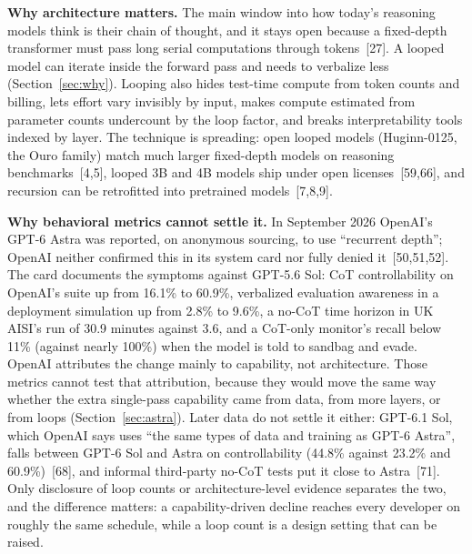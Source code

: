 \documentclass[11pt,letterpaper]{article}
\begin{document}
\textbf{Why architecture matters.} The main window into how today's reasoning models think is their chain of thought, and it stays open because a fixed-depth transformer must pass long serial computations through tokens~[27]. A looped model can iterate inside the forward pass and needs to verbalize less (Section~\ref{sec:why}). Looping also hides test-time compute from token counts and billing, lets effort vary invisibly by input, makes compute estimated from parameter counts undercount by the loop factor, and breaks interpretability tools indexed by layer. The technique is spreading: open looped models (Huginn-0125, the Ouro family) match much larger fixed-depth models on reasoning benchmarks~[4,5], looped 3B and 4B models ship under open licenses~[59,66], and recursion can be retrofitted into pretrained models~[7,8,9].

\textbf{Why behavioral metrics cannot settle it.} In September 2026 OpenAI's GPT-6 Astra was reported, on anonymous sourcing, to use ``recurrent depth''; OpenAI neither confirmed this in its system card nor fully denied it~[50,51,52]. The card documents the symptoms against GPT-5.6 Sol: CoT controllability on OpenAI's suite up from 16.1\% to 60.9\%, verbalized evaluation awareness in a deployment simulation up from 2.8\% to 9.6\%, a no-CoT time horizon in UK AISI's run of 30.9 minutes against 3.6, and a CoT-only monitor's recall below 11\% (against nearly 100\%) when the model is told to sandbag and evade. OpenAI attributes the change mainly to capability, not architecture. Those metrics cannot test that attribution, because they would move the same way whether the extra single-pass capability came from data, from more layers, or from loops (Section~\ref{sec:astra}). Later data do not settle it either: GPT-6.1 Sol, which OpenAI says uses ``the same types of data and training as GPT-6 Astra'', falls between GPT-6 Sol and Astra on controllability (44.8\% against 23.2\% and 60.9\%)~[68], and informal third-party no-CoT tests put it close to Astra~[71]. Only disclosure of loop counts or architecture-level evidence separates the two, and the difference matters: a capability-driven decline reaches every developer on roughly the same schedule, while a loop count is a design setting that can be raised.
\end{document}
